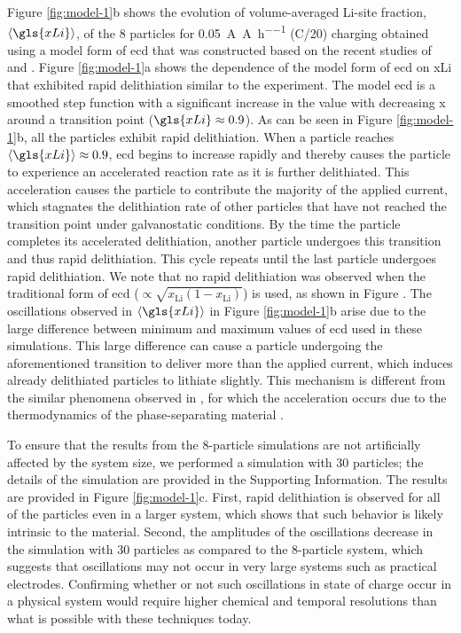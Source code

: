 \documentclass{article}
\begin{document}
Figure \ref{fig:model-1}b shows the evolution of volume-averaged
Li-site fraction, $\left\langle \gls{xLi} \right\rangle$, of the 8
particles for \SI{0.05}{\ampere\per\ampere\per\hour} (C/20) charging
obtained using a model form of \gls{ecd} that was constructed based on
the recent studies of \nca{} \cite{chueh2021} and \nmc{}
\cite{mukherjee2017, chiang2020, tsai2018}. Figure \ref{fig:model-1}a
shows the dependence of the model form of \gls{ecd} on \gls{xLi} that
exhibited rapid delithiation similar to the experiment. The model
\gls{ecd} is a smoothed step function with a significant increase in
the value with decreasing x around a transition point
($\gls{xLi}\approx0.9$). As can be seen in Figure \ref{fig:model-1}b,
all the particles exhibit rapid delithiation. When a particle reaches
$\left\langle \gls{xLi} \right\rangle\approx0.9$, \gls{ecd} begins to
increase rapidly and thereby causes the particle to experience an
accelerated reaction rate as it is further delithiated. This
acceleration causes the particle to contribute the majority of the
applied current, which stagnates the delithiation rate of other
particles that have not reached the transition point under
galvanostatic conditions. By the time the particle completes its
accelerated delithiation, another particle undergoes this transition
and thus rapid delithiation. This cycle repeats until the last
particle undergoes rapid delithiation.  We note that no rapid
delithiation was observed when the traditional form of \gls{ecd}
($\propto\sqrt{{x_{\textrm{Li}}}(1-{x_{\textrm{Li}}})}$) is
used\cite{newman1993, newman1996, newman1994, newman1995}, as shown in
Figure . The oscillations observed in
$\left\langle \gls{xLi} \right\rangle$ in Figure \ref{fig:model-1}b
arise due to the large difference between minimum and maximum values
of \gls{ecd} used in these simulations. This large difference can
cause a particle undergoing the aforementioned transition to deliver
more than the applied current, which induces already delithiated
particles to lithiate slightly. This mechanism is different from the
similar phenomena observed in , for which the
acceleration occurs due to the thermodynamics of the phase-separating
material \cite{thornton2015}.

To ensure that the results from the 8-particle simulations are not
artificially affected by the system size, we performed a simulation
with 30 particles; the details of the simulation are provided in the
Supporting Information. The results are provided in Figure
\ref{fig:model-1}c. First, rapid delithiation is observed for all of
the particles even in a larger system, which shows that such behavior
is likely intrinsic to the material. Second, the amplitudes of the
oscillations decrease in the simulation with 30 particles as compared
to the 8-particle system, which suggests that oscillations may not
occur in very large systems such as practical electrodes.  Confirming
whether or not such oscillations in state of charge occur in a
physical system would require higher chemical and temporal resolutions
than what is possible with these techniques today.
\end{document}
